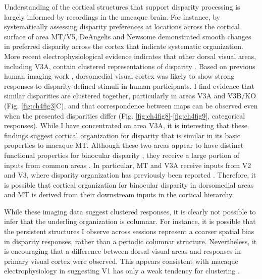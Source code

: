Understanding of the cortical structures that support disparity processing is largely informed by recordings in the macaque brain. For instance, by systematically assessing disparity preferences at locations across the cortical surface of area MT/V5, DeAngelis and Newsome \cite{DeAngelis:1999fk} demonstrated smooth changes in preferred disparity across the cortex that indicate systematic organization. More recent electrophysiological evidence indicates that other dorsal visual areas, including V3A, contain clustered representations of disparity \cite{Anzai:2011gb,Yeagle_Lafer-Sousa_Conway_2013}. Based on previous human imaging work \cite{Backus:2001ly,Preston:2008dg}, dorsomedial visual cortex was likely to show strong responses to disparity-defined stimuli in human participants. I find evidence that similar disparities are clustered together, particularly in areas V3A and V3B/KO (Fig. \ref{fig:ch4fig3}C), and that correspondence between maps can be observed even when the presented disparities differ (Fig. \ref{fig:ch4fig8}-\ref{fig:ch4fig9}, categorical responses). While I have concentrated on area V3A, it is interesting that these findings suggest cortical organization for disparity that is similar in its basic properties to macaque MT. Although these two areas appear to have distinct functional properties for binocular disparity \cite{Cottereau:2011uq}, they receive a large portion of inputs from common areas \cite{Felleman:1991kg}. In particular, MT and V3A receive inputs from V2 and V3, where disparity organization has previously been reported \cite{Roe:1995ys,Chen:2008vn,Adams:2001wt,Anzai:2011gb}. Therefore, it is possible that cortical organization for binocular disparity in dorsomedial areas and MT is derived from their downstream inputs in the cortical hierarchy.

While these imaging data suggest clustered responses, it is clearly not possible to infer that the underling organization is columnar. For instance, it is possible that the persistent structures I observe across sessions represent a coarser spatial bias in disparity responses, rather than a periodic columnar structure. Nevertheless, it is encouraging that a difference between dorsal visual areas and responses in primary visual cortex were observed. This appears consistent with macaque electrophysiology in suggesting V1 has only a weak tendency for clustering \cite{LeVay:1988ve,Prince:2002cr}.

